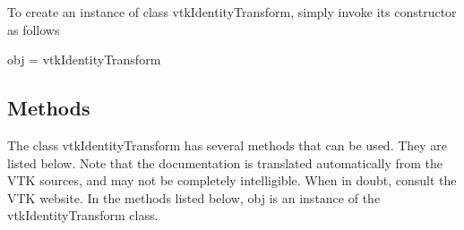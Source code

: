 To create an instance of class vtk\-Identity\-Transform, simply invoke its constructor as follows \begin{DoxyVerb}  obj = vtkIdentityTransform
\end{DoxyVerb}
 \hypertarget{vtkwidgets_vtkxyplotwidget_Methods}{}\subsection{Methods}\label{vtkwidgets_vtkxyplotwidget_Methods}
The class vtk\-Identity\-Transform has several methods that can be used. They are listed below. Note that the documentation is translated automatically from the V\-T\-K sources, and may not be completely intelligible. When in doubt, consult the V\-T\-K website. In the methods listed below, {\ttfamily obj} is an instance of the vtk\-Identity\-Transform class. 
